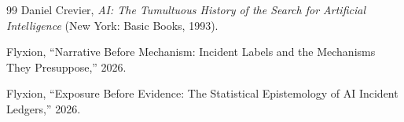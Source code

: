 \documentclass[11pt]{article}
\begin{document}
\begin{thebibliography}{99}
 Daniel Crevier, \emph{AI: The Tumultuous History of the Search for Artificial Intelligence} (New York: Basic Books, 1993).

 Flyxion, ``Narrative Before Mechanism: Incident Labels and the Mechanisms They Presuppose,'' 2026.

 Flyxion, ``Exposure Before Evidence: The Statistical Epistemology of AI Incident Ledgers,'' 2026.

\end{thebibliography}
\end{document}
